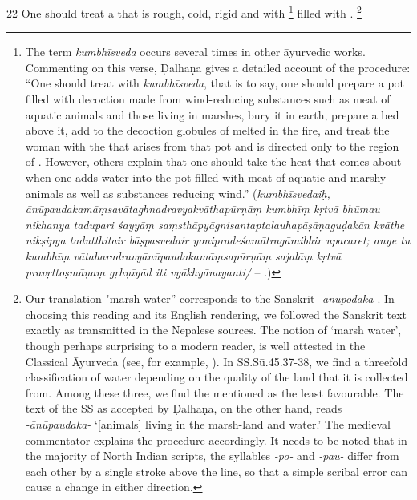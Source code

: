 \begin{translation}
\item [22]
One should treat a   that is rough, cold, rigid and  with %
\footnote{%
The term \textit{kumbhīsveda} occurs several times in other āyurvedic works. 
Commenting on this verse, Ḍalhaṇa gives a detailed account of the procedure: 
``One should treat with \textit{kumbhīsveda}, that is to say, one should 
prepare a pot filled with decoction made from wind-reducing substances 
such as meat of aquatic animals and those living in marshes, bury it in earth, 
prepare a bed above it, add to the decoction globules of 
 melted in the fire, and treat the woman 
with the  that arises from that pot and is directed 
only to the region of . However, others explain 
that one should take the heat that comes about when one adds water into 
the pot filled with meat of aquatic and marshy animals as well as substances 
reducing wind.''
 (\textit{kumbhīsvedaiḥ, ānūpaudakamāṃsavātaghnadravyakvāthapūrṇāṃ 
 kumbhīṃ kṛtvā bhūmau nikhanya tadupari śayyāṃ 
 saṃsthāpyāgnisantaptalauhapāṣāṇaguḍakān kvāthe nikṣipya tadutthitair 
 bāṣpasvedair yonipradeśamātragāmibhir upacaret; anye tu kumbhīṃ 
 vātaharadravyānūpaudakamāṃsapūrṇāṃ sajalāṃ kṛtvā pravṛttoṣmāṇaṃ 
 gṛhṇīyād iti vyākhyānayanti/} -- .)
} 
filled with .%
	\footnote{%
	Our translation "marsh water” corresponds to the Sanskrit \textit{-ānūpodaka-}. In choosing this reading and its English rendering, we followed the Sanskrit text exactly as transmitted in the Nepalese sources. The notion of ‘marsh water’, though perhaps surprising to a modern reader, is well attested in the Classical Āyurveda (see, for example, \citet[74-76]{ange-2020}). In  SS.Sū.45.37-38, we find a threefold classification of water depending on the quality of the land that it is collected from. Among these three, we find the  mentioned as the least favourable.
	The text of the SS as accepted by Ḍalhaṇa, on the other hand, reads \textit{-ānūpaudaka-} ‘[animals] living in the marsh-land and water.’ The medieval commentator explains the procedure accordingly. 
	It needs to be noted that in the majority of North Indian scripts, the syllables \textit{-po-} and \textit{-pau-} differ from each other by a single stroke above the line, so that a simple scribal error can cause a change in either direction.%
	}


\end{translation}

